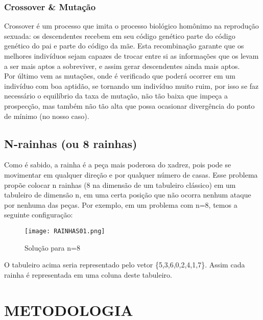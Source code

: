 \documentclass[12pt,a4paper]{article}
\begin{document}
\subsubsection{Crossover \& Mutação}

\hspace{4ex}Crossover é um processo que imita o processo biológico homônimo na reprodução sexuada: os descendentes recebem em seu código genético parte do código genético do pai e parte do código da mãe. Esta recombinação garante que os melhores indivíduos sejam capazes de trocar entre si as informações que os levam a ser mais aptos a sobreviver, e assim gerar descendentes ainda mais aptos.\\

Por último vem as mutações, onde é verificado que poderá ocorrer em um indivíduo com boa aptidão, se tornando um indivíduo muito ruim, por isso se faz necessário o equilíbrio da taxa de mutação, não tão baixa que impeça a prospecção, mas também não tão alta que possa ocasionar divergência do ponto de mínimo (no nosso caso).


\newpage
\thispagestyle{main}

\subsection{N-rainhas (ou 8 rainhas)}

\hspace{4ex}Como é sabido, a rainha é a peça mais poderosa do xadrez, pois pode se movimentar em qualquer direção e por qualquer número de casas. Esse problema propõe colocar n rainhas (8 na dimensão de um tabuleiro clássico) em um tabuleiro de dimensão n, em uma certa posição que não ocorra nenhum ataque por nenhuma das peças. Por exemplo, em um problema com n=8, temos a seguinte configuração:\\

\begin{figure}[!htb]
	\label{Figura 2}
	\centering
	\caption{Solução para n=8}
	\texttt{[image: RAINHAS01.png]}
\end{figure}

O tabuleiro acima seria representado pelo vetor \{5,3,6,0,2,4,1,7\}. Assim cada rainha é representada em uma coluna deste tabuleiro.
\section{METODOLOGIA}
\end{document}
